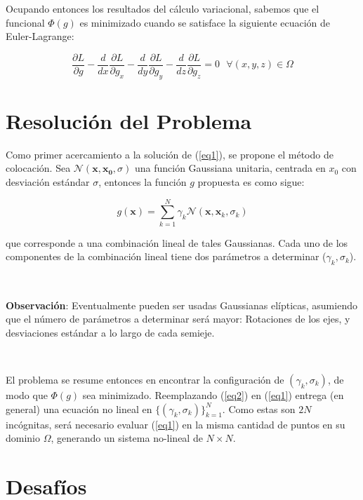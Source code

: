\documentclass[spanish, fleqn]{article}
\begin{document}
Ocupando entonces los resultados del cálculo variacional, sabemos que el funcional $\Phi(g)$ es minimizado cuando
se satisface la siguiente ecuación de Euler-Lagrange:

\begin{equation}
    \frac{\partial L}{\partial g} - \frac{d}{dx}\frac{\partial L}{\partial g_x}
    - \frac{d}{dy}\frac{\partial L}{\partial g_y} - \frac{d}{dz}\frac{\partial L}{\partial g_z} = 0
    \ \ \ \forall (x,y,z) \in \Omega
\label{eq1}
\end{equation}

\section{Resolución del Problema}

Como primer acercamiento a la solución de (\ref{eq1}), se propone el método de colocación. Sea $\mathcal{N}(\mathbf{x},\mathbf{x_0},\sigma)$ una función Gaussiana unitaria, centrada en $x_0$ con desviación estándar $\sigma$, entonces la función $g$ propuesta es
como sigue:

\begin{equation}
     g(\mathbf{x}) = \sum_{k=1}^N \gamma_k \mathcal{N}(\mathbf{x}, \mathbf{x}_k, \sigma_k)
 \label{eq2}
 \end{equation}

 \noindent que corresponde a una combinación lineal de tales Gaussianas. Cada uno de los componentes de la combinación lineal tiene dos parámetros a determinar ($\gamma_k, \sigma_k$).

 \

 \textbf{Observación}: Eventualmente pueden ser usadas Gaussianas elípticas, asumiendo que el número de parámetros a
 determinar será mayor: Rotaciones de los ejes, y desviaciones estándar a lo largo de cada semieje.

\

El problema se resume entonces en encontrar la configuración de $(\gamma_k, \sigma_k)$, de modo que
$\Phi(g)$ sea minimizado. Reemplazando (\ref{eq2}) en (\ref{eq1}) entrega (en general) una ecuación no lineal en
$\{(\gamma_k, \sigma_k)\}_{k=1}^N$. Como estas son $2N$ incógnitas, será necesario evaluar (\ref{eq1}) en la misma
cantidad de puntos en su dominio $\Omega$, generando un sistema no-lineal de $N\times N$.

\section{Desafíos}
\end{document}
